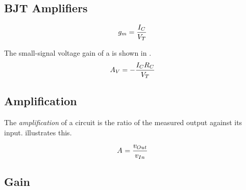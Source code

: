 \subsection{BJT Amplifiers}\label{subsec:BJT_Amps}
\begin{equation}\label{eq:BJT-Transconductance_Gain}
  \TransconductanceGain = \frac{\DCCurrent{\Collector}}{\ThermalVoltage}
\end{equation}

The small-signal voltage gain of a  is shown in .
\begin{equation}\label{eq:BJT-Small_Signal_Voltage_Gain}
  \Amp{V} = - \frac{\DCCurrent{\Collector} R_{\Collector}}{\ThermalVoltage}
\end{equation}

\subsection{Amplification}\label{subsec:Amplification}
The \emph{amplification} of a circuit is the ratio of the measured output against its input.
 illustrates this.

\begin{equation}\label{eq:Amplification}
  \Amp{} = \frac{\ACVoltage{\Out}}{\ACVoltage{\In}}
\end{equation}

\subsection{Gain}\label{subsec:Gain}

